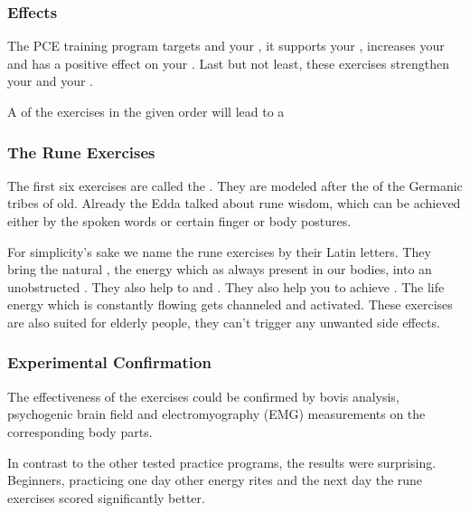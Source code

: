 \begin{frame}
  \frametitle{Effects}

  The PCE training program targets  and your ,
  it supports your ,
  increases your  and has a positive effect on your .
  Last but not least, these exercises strengthen your  and your .

  A  of the exercises in the given order will lead to a 
\end{frame}

\begin{frame}
  \frametitle{The Rune Exercises}

  The first six exercises are called the .
  They are modeled after the  of the Germanic tribes of old.
  Already the Edda talked about rune wisdom, which can be achieved either by the spoken words or certain finger or body postures.


  For simplicity's sake we name the rune exercises by their Latin letters.
  They bring the natural , the energy which as always present in our bodies, into an unobstructed .
  They also help to  and .
  They also help you to achieve .
  The life energy which is constantly flowing gets channeled and activated.
  These exercises are also suited for elderly people, they can't trigger any unwanted side effects.
  

\end{frame}


\begin{frame}
  \frametitle{Experimental Confirmation}

  The effectiveness of the exercises could be confirmed by bovis analysis,
  psychogenic brain field and
  electromyography (EMG) measurements on the corresponding body parts.

  In contrast to the other tested practice programs, the results were surprising.
  Beginners, practicing one day other energy rites and the next day the rune exercises scored significantly better.
\end{frame}

